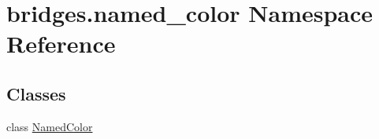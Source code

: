 \hypertarget{namespacebridges_1_1named__color}{}\section{bridges.\+named\+\_\+color Namespace Reference}
\label{namespacebridges_1_1named__color}
\subsection*{Classes}
\begin{DoxyCompactItemize}
\item 
class \mbox{\hyperlink{classbridges_1_1named__color_1_1_named_color}{Named\+Color}}
\end{DoxyCompactItemize}
